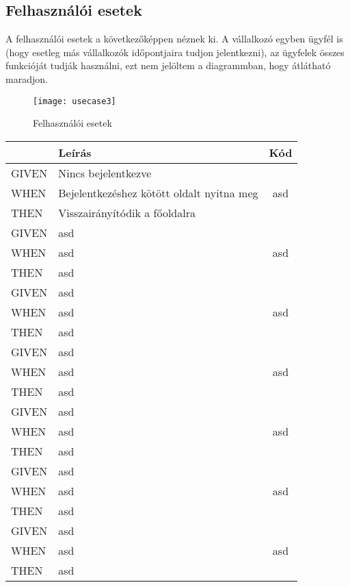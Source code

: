 \subsection{Felhasználói esetek}
A felhasználói esetek a következőképpen néznek ki. A vállalkozó egyben ügyfél is (hogy esetleg más vállalkozók időpontjaira tudjon jelentkezni), az ügyfelek összes funkcióját tudják használni, ezt nem jelöltem a diagrammban, hogy átlátható maradjon.

\begin{figure}[H]
	\centering
	\texttt{[image: usecase3]}
	\caption{Felhasználói esetek}
	\label{fig:usecases}
\end{figure}



\begin{table}[H]
	\centering
	\begin{tabular}{|l|l|c|}
		\hline
		& \textbf{Leírás} & \textbf{Kód} \\
		\hline
		GIVEN & Nincs bejelentkezve & \multirow{3}{*}{asd} \\ \cline{1-2}
		WHEN & Bejelentkezéshez kötött oldalt nyitna meg & \\ \cline{1-2}
		THEN & Visszairányítódik a főoldalra & \\ 
		\hline
		GIVEN & asd & \multirow{3}{*}{asd} \\ \cline{1-2}
		WHEN & asd & \\ \cline{1-2}
		THEN & asd & \\ 
		\hline
		GIVEN & asd & \multirow{3}{*}{asd} \\ \cline{1-2}
		WHEN & asd & \\ \cline{1-2}
		THEN & asd & \\ 
		\hline
		GIVEN & asd & \multirow{3}{*}{asd} \\ \cline{1-2}
		WHEN & asd & \\ \cline{1-2}
		THEN & asd & \\ 
		\hline
		GIVEN & asd & \multirow{3}{*}{asd} \\ \cline{1-2}
		WHEN & asd & \\ \cline{1-2}
		THEN & asd & \\ 
		\hline
		GIVEN & asd & \multirow{3}{*}{asd} \\ \cline{1-2}
		WHEN & asd & \\ \cline{1-2}
		THEN & asd & \\ 
		\hline
		GIVEN & asd & \multirow{3}{*}{asd} \\ \cline{1-2}
		WHEN & asd & \\ \cline{1-2}
		THEN & asd & \\ 
		\hline
	\end{tabular}
\end{table}

